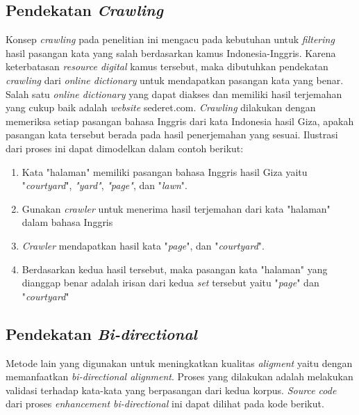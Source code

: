 \subsection{Pendekatan \textit{Crawling}}

Konsep \textit{crawling} pada penelitian ini mengacu pada kebutuhan untuk \textit{filtering} hasil pasangan kata yang salah berdasarkan kamus Indonesia-Inggris. Karena keterbatasan \textit{resource digital} kamus tersebut, maka dibutuhkan pendekatan \textit{crawling} dari \textit{online dictionary} untuk mendapatkan pasangan kata yang benar. Salah satu \textit{online dictionary} yang dapat diakses dan memiliki hasil terjemahan yang cukup baik adalah \textit{website} sederet.com. \textit{Crawling} dilakukan dengan memeriksa setiap pasangan bahasa Inggris dari kata Indonesia hasil Giza, apakah pasangan kata tersebut berada pada hasil penerjemahan yang sesuai. Ilustrasi dari proses ini dapat dimodelkan dalam contoh berikut:

\begin{enumerate}
	\item Kata "halaman" memiliki pasangan bahasa Inggris hasil Giza yaitu  "\textit{courtyard}", \textit{"yard"}, \textit{"page"}, dan "\textit{lawn}".
	\item Gunakan \textit{crawler} untuk menerima hasil terjemahan dari kata "halaman" dalam bahasa Inggris
	\item \textit{Crawler} mendapatkan hasil kata "\textit{page}", dan "\textit{courtyard}".
	\item Berdasarkan kedua hasil tersebut, maka pasangan kata "halaman" yang dianggap benar adalah irisan dari kedua \textit{set} tersebut yaitu "\textit{page}" dan "\textit{courtyard}"
\end{enumerate}

\subsection{Pendekatan \textit{Bi-directional}}

Metode lain yang digunakan untuk meningkatkan kualitas \textit{aligment} yaitu dengan memanfaatkan \textit{bi-directional alignment}. Proses yang dilakukan adalah melakukan validasi terhadap kata-kata yang berpasangan  dari kedua korpus. \textit{Source code} dari proses \textit{enhancement bi-directional} ini dapat dilihat pada kode berikut.

